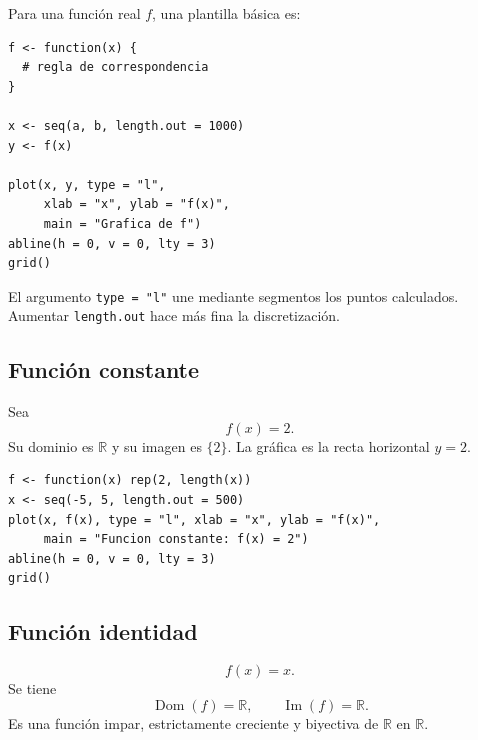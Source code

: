 \documentclass[12pt]{article}
\theoremstyle{remark}
\newcommand{\R}{\mathbb{R}}
\newcommand{\Dom}{\operatorname{Dom}}
\newcommand{\Ima}{\operatorname{Im}}
\begin{document}
Para una función real $f$, una plantilla básica es:

\begin{verbatim}
f <- function(x) {
  # regla de correspondencia
}

x <- seq(a, b, length.out = 1000)
y <- f(x)

plot(x, y, type = "l",
     xlab = "x", ylab = "f(x)",
     main = "Grafica de f")
abline(h = 0, v = 0, lty = 3)
grid()
\end{verbatim}

El argumento \texttt{type = "l"} une mediante segmentos los puntos calculados.
Aumentar \texttt{length.out} hace más fina la discretización.

\subsection*{Función constante}

Sea
\[
f(x)=2.
\]
Su dominio es $\R$ y su imagen es $\{2\}$. La gráfica es la recta horizontal
$y=2$.

\begin{center}
\end{center}

\begin{verbatim}
f <- function(x) rep(2, length(x))
x <- seq(-5, 5, length.out = 500)
plot(x, f(x), type = "l", xlab = "x", ylab = "f(x)",
     main = "Funcion constante: f(x) = 2")
abline(h = 0, v = 0, lty = 3)
grid()
\end{verbatim}

\subsection*{Función identidad}

\[
f(x)=x.
\]
Se tiene
\[
\Dom(f)=\R,\qquad \Ima(f)=\R.
\]
Es una función impar, estrictamente creciente y biyectiva de $\R$ en $\R$.

\begin{center}
\end{center}
\end{document}
